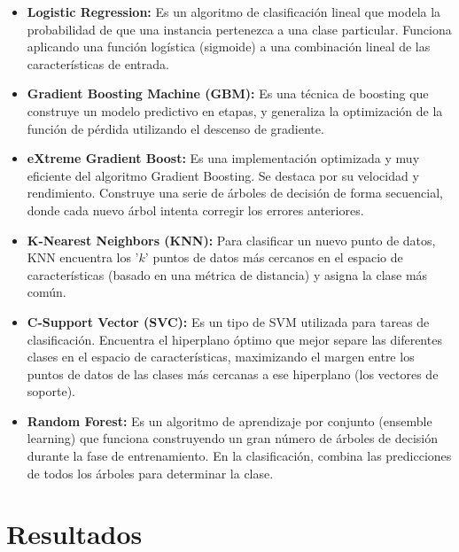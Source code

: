 \documentclass{replab}
\begin{document}
        \begin{itemize}[itemsep=-2pt]

            \item \textbf{Logistic Regression:}
            Es un algoritmo de clasificación lineal que modela la probabilidad de que una instancia pertenezca a una clase particular. Funciona aplicando una función logística (sigmoide) a una combinación lineal de las características de entrada. \cite{cramer}

            \item \textbf{Gradient Boosting Machine (GBM):}
            Es una técnica de boosting que construye un modelo predictivo en etapas, y generaliza la optimización de la función de pérdida utilizando el descenso de gradiente. \cite{friedman}

            \item \textbf{eXtreme Gradient Boost:}
            Es una implementación optimizada y muy eficiente del algoritmo Gradient Boosting. Se destaca por su velocidad y rendimiento. Construye una serie de árboles de decisión de forma secuencial, donde cada nuevo árbol intenta corregir los errores anteriores. \cite{chen}

            \item \textbf{K-Nearest Neighbors (KNN):}
            Para clasificar un nuevo punto de datos, KNN encuentra los '$k$' puntos de datos más cercanos en el espacio de características (basado en una métrica de distancia) y asigna la clase más común. \cite{cunningham}

            \item \textbf{C-Support Vector (SVC):}
            Es un tipo de SVM utilizada para tareas de clasificación. Encuentra el hiperplano óptimo que mejor separe las diferentes clases en el espacio de características, maximizando el margen entre los puntos de datos de las clases más cercanas a ese hiperplano (los vectores de soporte). \cite{novakovic}

            \item \textbf{Random Forest:}
            Es un algoritmo de aprendizaje por conjunto (ensemble learning) que funciona construyendo un gran número de árboles de decisión durante la fase de entrenamiento. En la clasificación, combina las predicciones de todos los árboles para determinar la clase. \cite{cutler}

        \end{itemize}


\section{Resultados}
\end{document}

